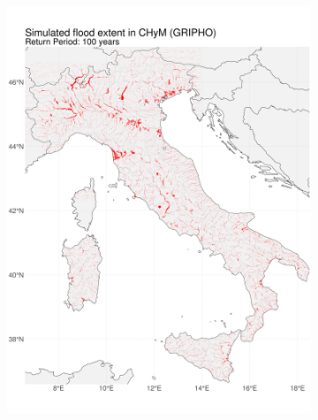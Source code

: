 \begin{figure}
\begin{subfigure}{.49\textwidth}
        \includegraphics[width=\textwidth]{figures/valid_flood/flooded_areas/T100}
    \end{subfigure}\\
    \begin{subfigure}{.49\textwidth}

\end{subfigure}
\end{figure}
